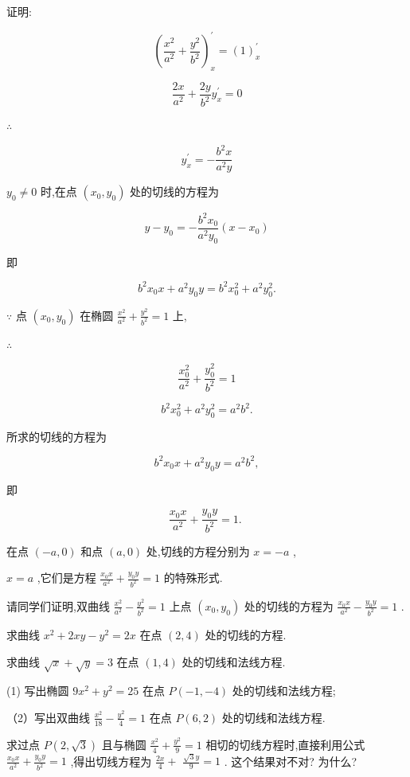 \documentclass[lang=cn,newtx,12pt,scheme=chinese]{elegantbook}
\begin{document}
证明:

\[
{\left( \frac{{x}^{2}}{{a}^{2}} + \frac{{y}^{2}}{{b}^{2}}\right) }_{x}^{\prime } = {\left( 1\right) }_{x}^{\prime }
\]

\[
\frac{2x}{{a}^{2}} + \frac{2y}{{b}^{2}}{y}_{x}^{\prime } = 0
\]

\(\therefore\)

\[
{y}_{x}^{\prime } = - \frac{{b}^{2}x}{{a}^{2}y}
\]

\({y}_{0} \neq 0\) 时,在点 \(\left( {{x}_{0},{y}_{0}}\right)\) 处的切线的方程为

\[
y - {y}_{0} = - \frac{{b}^{2}{x}_{0}}{{a}^{2}{y}_{0}}\left( {x - {x}_{0}}\right)
\]

即

\[
{b}^{2}{x}_{0}x + {a}^{2}{y}_{0}y = {b}^{2}{x}_{0}^{2} + {a}^{2}{y}_{0}^{2}.
\]

\(\because\) 点 \(\left( {{x}_{0},{y}_{0}}\right)\) 在椭圆 \(\frac{{x}^{2}}{{a}^{2}} + \frac{{y}^{2}}{{b}^{2}} = 1\) 上,

\(\therefore\)

\[
\frac{{x}_{0}^{2}}{{a}^{2}} + \frac{{y}_{0}^{2}}{{b}^{2}} = 1
\]

\[
{b}^{2}{x}_{0}^{2} + {a}^{2}{y}_{0}^{2} = {a}^{2}{b}^{2}.
\]

所求的切线的方程为

\[
{b}^{2}{x}_{0}x + {a}^{2}{y}_{0}y = {a}^{2}{b}^{2},
\]

即

\[
\frac{{x}_{0}x}{{a}^{2}} + \frac{{y}_{0}y}{{b}^{2}} = 1\text{. }
\]

在点 \(\left( {-a,0}\right)\) 和点 \(\left( {a,0}\right)\) 处,切线的方程分别为 \(x = - a\) ,

\(x = a\) ,它们是方程 \(\frac{{x}_{0}x}{{a}^{2}} + \frac{{y}_{0}y}{{b}^{2}} = 1\) 的特殊形式.

请同学们证明,双曲线 \(\frac{{x}^{2}}{{a}^{2}} - \frac{{y}^{2}}{{b}^{2}} = 1\) 上点 \(\left( {{x}_{0},{y}_{0}}\right)\) 处的切线的方程为 \(\frac{{x}_{0}x}{{a}^{2}} - \frac{{y}_{0}y}{{b}^{2}} = 1\) .

\begin{problemset}[练习]

\item 求曲线 \({x}^{2} + {2xy} - {y}^{2} = {2x}\) 在点 \(\left( {2,4}\right)\) 处的切线的方程.

\item 求曲线 \(\sqrt{x} + \sqrt{y} = 3\) 在点 \(\left( {1,4}\right)\) 处的切线和法线方程.

\item (1) 写出椭圆 \(9{x}^{2} + {y}^{2} = {25}\) 在点 \(P\left( {-1, - 4}\right)\) 处的切线和法线方程;

（2）写出双曲线 \(\frac{{x}^{2}}{18} - \frac{{y}^{2}}{4} = 1\) 在点 \(P\left( {6,2}\right)\) 处的切线和法线方程.

\item 求过点 \(P\left( {2,\sqrt{3}}\right)\) 且与椭圆 \(\frac{{x}^{2}}{4} + \frac{{y}^{2}}{9} = 1\) 相切的切线方程时,直接利用公式 \(\frac{{x}_{0}x}{{a}^{2}} + \frac{{y}_{0}y}{{b}^{2}} = 1\) ,得出切线方程为 \(\frac{2x}{4} +\) \(\frac{\sqrt{3}y}{9} = 1\) . 这个结果对不对? 为什么?

\end{problemset}
\end{document}
